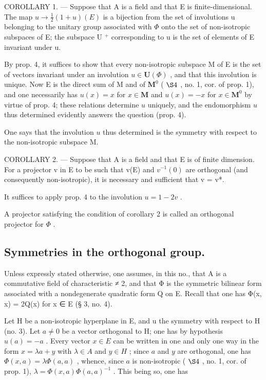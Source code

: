 COROLLARY 1. --- Suppose that A is a field and that E is finite-dimensional. The map \(u \to \frac{1}{2}(1 + u)(E)\) is a bijection from the set of involutions u belonging to the unitary group associated with \(\Phi\) onto the set of non-isotropic subspaces of E; the subspace U \(^+\) corresponding to u is the set of elements of E invariant under u.

By prop. 4, it suffices to show that every non-isotropic subspace M of E is the set of vectors invariant under an involution \(u \in \mathbf{U}(\Phi)\) , and that this involution is unique. Now E is the direct sum of M and of \(\mathbf{M}^0\) ( \(\S 4\) , no. 1, cor. of prop. 1), and one necessarily has \(u(x) = x\) for \(x \in \mathbf{M}\) and \(u(x) = -x\) for \(x \in \mathbf{M}^0\) by virtue of prop. 4; these relations determine \(u\) uniquely, and the endomorphism \(u\) thus determined evidently answers the question (prop. 4).

One says that the involution \(u\) thus determined is the symmetry with respect to the non-isotropic subspace M.

COROLLARY 2. --- Suppose that A is a field and that E is of finite dimension. For a projector v in E to be such that v(E) and \(v^{-1}(0)\) are orthogonal (and consequently non-isotropic), it is necessary and sufficient that v = v*.

It suffices to apply prop. 4 to the involution \(u = 1 - 2v\) .

A projector satisfying the condition of corollary 2 is called an orthogonal projector for \(\Phi\) .

\subsection{Symmetries in the orthogonal group.}

Unless expressly stated otherwise, one assumes, in this no., that A is a commutative field of characteristic ≠ 2, and that Φ is the symmetric bilinear form associated with a nondegenerate quadratic form Q on E. Recall that one has Φ(x, x) = 2Q(x) for x ∈ E (§ 3, no. 4).

Let H be a non-isotropic hyperplane in E, and u the symmetry with respect to H (no. 3). Let \(a \neq 0\) be a vector orthogonal to H; one has by hypothesis \(u(a) = -a\) . Every vector \(x \in E\) can be written in one and only one way in the form \(x = \lambda a + y\) with \(\lambda \in A\) and \(y \in H\) ; since \(a\) and \(y\) are orthogonal, one has \(\Phi(x, a) = \lambda \Phi(a, a)\) , whence, since \(a\) is non-isotropic ( \(\S 4\) , no. 1, cor. of prop. 1), \(\lambda = \Phi(x, a) \Phi(a, a)^{-1}\) . This being so, one has

